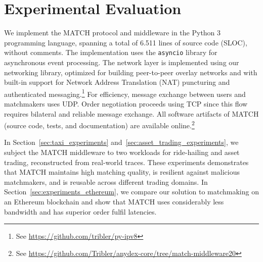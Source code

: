 \section{Experimental Evaluation}
\label{sec:experiments}
We implement the MATCH protocol and middleware in the Python 3 programming language, spanning a total of 6.511 lines of source code (SLOC), without comments.
The implementation uses the \texttt{asyncio} library for asynchronous event processing.
The network layer is implemented using our networking library, optimized for building peer-to-peer overlay networks and with built-in support for Network Address Translation (NAT) puncturing and authenticated messaging.\footnote{See \url{https://github.com/tribler/py-ipv8}}
For efficiency, message exchange between users and matchmakers uses UDP.
Order negotiation proceeds using TCP since this flow requires bilateral and reliable message exchange.
All software artifacts of MATCH (source code, tests, and documentation) are available online.\footnote{See \url{https://github.com/Tribler/anydex-core/tree/match-middleware20}}

In Section~\ref{sec:taxi_experiments} and~\ref{sec:asset_trading_experiments}, we subject the MATCH middleware to two workloads for ride-hailing and asset trading, reconstructed from real-world traces.
These experiments demonstrates that MATCH maintains high matching quality, is resilient against malicious matchmakers, and is reusable across different trading domains.
In Section~\ref{sec:experiments_ethereum}, we compare our solution to matchmaking on an Ethereum blockchain and show that MATCH uses considerably less bandwidth and has superior order fulfil latencies.

